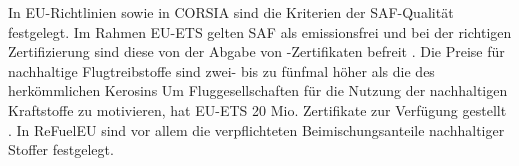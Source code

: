 %
%
%
%
%
%
In EU-Richtlinien sowie in CORSIA sind die Kriterien der SAF-Qualität festgelegt.
Im Rahmen EU-ETS gelten SAF als emissionsfrei und bei der richtigen Zertifizierung 
sind diese von der Abgabe von -Zertifikaten befreit \cite{icao_saf_conversion_2024}. 
Die Preise für nachhaltige Flugtreibstoffe sind zwei- bis zu fünfmal höher 
als die des herkömmlichen Kerosins \cite{iata_saf_2024} %
Um Fluggesellschaften für die Nutzung der nachhaltigen Kraftstoffe zu motivieren, hat EU-ETS
20 Mio. Zertifikate zur Verfügung gestellt \cite{icao_saf_conversion_2024}. 
In ReFuelEU sind vor allem die verpflichteten Beimischungsanteile nachhaltiger Stoffer festgelegt.


